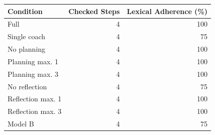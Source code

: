\begin{tabular}{lrr}
\toprule
Condition & Checked Steps & Lexical Adherence (\%) \\
\midrule
Full & 4 & 100 \\
Single coach & 4 & 75 \\
No planning & 4 & 100 \\
Planning max. 1 & 4 & 100 \\
Planning max. 3 & 4 & 100 \\
No reflection & 4 & 75 \\
Reflection max. 1 & 4 & 100 \\
Reflection max. 3 & 4 & 100 \\
Model B & 4 & 75 \\
\bottomrule
\end{tabular}
